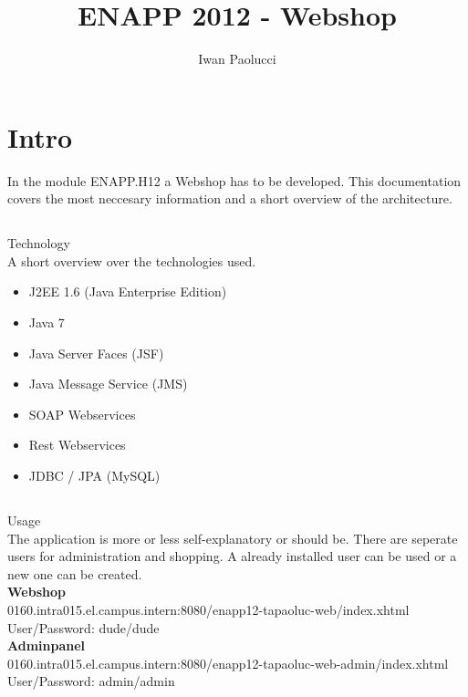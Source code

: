 \documentclass[11pt]{amsart}
\begin{document}
\title{ENAPP 2012 - Webshop}
\author{Iwan Paolucci}
%
\maketitle
%
\section{Intro}
In the module ENAPP.H12 a Webshop has to be developed. This documentation covers the most neccesary information and a short overview of the architecture. \\
\subsection{}Technology\\
A short overview over the technologies used.
\begin{itemize}
\item J2EE 1.6 (Java Enterprise Edition)
\item Java 7
\item Java Server Faces (JSF)
\item Java Message Service (JMS)
\item SOAP Webservices
\item Rest Webservices
\item JDBC / JPA (MySQL)
\end{itemize}
%
\subsection{}Usage\\
The application is more or less self-explanatory or should be. There are seperate users for administration and shopping. A already installed user can be used or a new one can be created. \\
%
\textbf{Webshop}\\
\textsf{0160.intra015.el.campus.intern:8080/enapp12-tapaoluc-web/index.xhtml} \\
User/Password: dude/dude\\
%
\textbf{Adminpanel} \\
\textsf{0160.intra015.el.campus.intern:8080/enapp12-tapaoluc-web-admin/index.xhtml} \\
User/Password: admin/admin \\
\newpage{}
\end{document}
